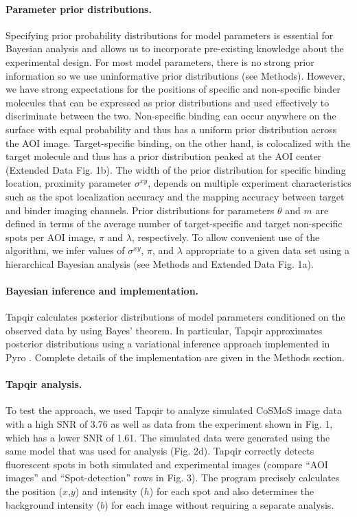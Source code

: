 \paragraph{Parameter prior distributions.}
Specifying prior probability distributions for model parameters is essential for Bayesian analysis and allows us to incorporate pre-existing knowledge about the experimental design. For most model parameters, there is no strong prior information so we use uninformative prior distributions (see Methods). However, we have strong expectations for the positions of specific and non-specific binder molecules that can be expressed as prior distributions and used effectively to discriminate between the two. Non-specific binding can occur anywhere on the surface with equal probability and thus has a uniform prior distribution across the AOI image. Target-specific binding, on the other hand, is colocalized with the target molecule and thus has a prior distribution peaked at the AOI center (Extended Data Fig. 1b). The width of the prior distribution for specific binding location, proximity parameter $\sigma^{xy}$, depends on multiple experiment characteristics such as the spot localization accuracy and the mapping accuracy between target and binder imaging channels. Prior distributions for parameters $\theta$ and $m$ are defined in terms of the average number of target-specific and target non-specific spots per AOI image, $\pi$ and $\lambda$, respectively. To allow convenient use of the algorithm, we infer values of $\sigma^{xy}$, $\pi$, and $\lambda$ appropriate to a given data set using a hierarchical Bayesian analysis (see Methods and Extended Data Fig. 1a).

\paragraph{Bayesian inference and implementation.}
Tapqir calculates posterior distributions of model parameters conditioned on the observed data by using Bayes' theorem. In particular, Tapqir approximates posterior distributions using a variational inference approach implemented in Pyro \cite{Bingham2019-qy}.  Complete details of the implementation are given in the Methods section.

\paragraph{Tapqir analysis.} %
To test the approach, we used Tapqir to analyze simulated CoSMoS image data with a high SNR of 3.76 as well as data from the experiment shown in Fig. 1, which has a lower SNR of 1.61. The simulated data were generated using the same model that was used for analysis (Fig. 2d). Tapqir correctly detects fluorescent spots in both simulated and experimental images (compare ``AOI images'' and ``Spot-detection'' rows in Fig. 3). The program precisely calculates the position ($x$,$y$) and intensity ($h$) for each spot and also determines the background intensity ($b$) for each image without requiring a separate analysis. 

